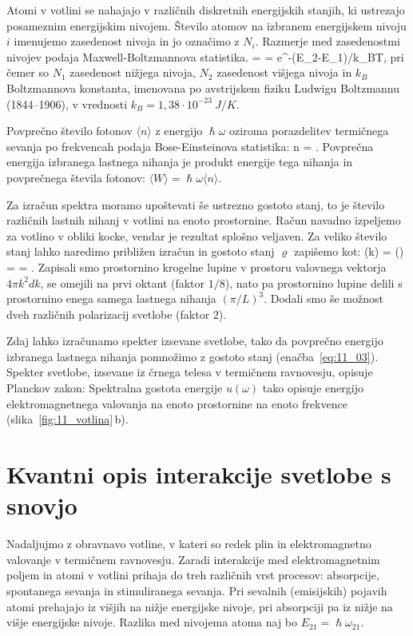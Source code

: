 Atomi v votlini se nahajajo v različnih diskretnih energijskih stanjih,
ki ustrezajo posameznim energijskim nivojem. Število atomov na izbranem
energijskem nivoju $i$ imenujemo zasedenost nivoja in jo označimo z $N_i$.
Razmerje med zasedenostmi nivojev podaja
Maxwell-Boltzmannova statistika. 
\beq
{} =  = e^{-(E_2-E_1)/k_BT},
\label{eq:11_01}
\eeq
pri čemer so $N_1$ zasedenost nižjega nivoja, $N_2$ zasedenost višjega 
nivoja in $k_B$ Boltzmannova konstanta, imenovana po avstrijskem
fiziku Ludwigu Boltzmannu (1844--1906), v vrednosti 
$k_B = 1,38 \cdot 10^{-23}~\si{J/K}$.

Povprečno število fotonov $\langle n \rangle$ 
z energijo $\hslash \omega$ oziroma porazdelitev 
termičnega sevanja po frekvencah podaja 
Bose-Einsteinova statistika:
\beq
\langle n \rangle = .
\label{eq:11_02}
\eeq
Povprečna energija izbranega lastnega nihanja je produkt energije tega nihanja
in povprečnega števila fotonov: $\langle W \rangle = \hslash \omega \langle n \rangle$.

Za izračun spektra moramo upoštevati še ustrezno gostoto stanj, to je število 
različnih lastnih nihanj v votlini na enoto prostornine.
Račun navadno izpeljemo za votlino v obliki kocke, vendar je rezultat splošno veljaven.
Za veliko število stanj lahko naredimo približen izračun in gostoto stanj $\varrho$
zapišemo kot:
\beq
\varrho (k) =  \qquad {}\qquad
\varrho (\omega) =  = 
.
\label{eq:11_03}
\eeq
Zapisali smo prostornino krogelne lupine v prostoru valovnega vektorja $4\pi k^2 dk$, 
se omejili na prvi oktant (faktor $1/8$), 
nato pa prostornino lupine delili s prostornino enega samega
lastnega nihanja $(\pi/L)^3$. Dodali smo še možnost dveh različnih polarizacij 
svetlobe (faktor $2$).

Zdaj lahko izračunamo spekter izsevane svetlobe, tako da povprečno 
energijo izbranega lastnega nihanja pomnožimo z gostoto stanj 
(enačba~\ref{eq:11_03}). Spekter svetlobe, izsevane iz črnega telesa v 
termičnem ravnovesju, opisuje Planckov zakon:
Spektralna gostota energije $u(\omega)$ tako opisuje energijo elektromagnetnega
valovanja na enoto prostornine na enoto frekvence (slika~\ref{fig:11_votlina}\,b). 

\section{Kvantni opis interakcije svetlobe s snovjo}
Nadaljujmo z obravnavo votline, v kateri so redek plin 
in elektromagnetno valovanje v termičnem ravnovesju. Zaradi interakcije med 
elektromagnetnim poljem in atomi v votlini prihaja do treh različnih
vrst procesov: absorpcije, spontanega sevanja in stimuliranega sevanja. 
Pri sevalnih (emisijskih) pojavih atomi prehajajo iz višjih na nižje 
energijske nivoje, pri absorpciji pa iz nižje na višje energijske nivoje. 
Razlika med nivojema atoma naj bo $E_{21} = \hslash \omega_{21}$.


